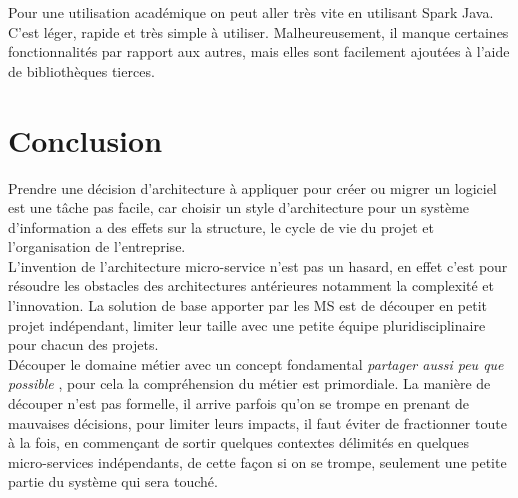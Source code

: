 \documentclass[12pt, a4paper, openany]{report}
\begin{document}
   Pour une utilisation académique on peut aller très vite en utilisant Spark Java. C'est léger, rapide et très simple à utiliser. Malheureusement, il manque certaines fonctionnalités par rapport aux autres, mais elles sont facilement ajoutées à l'aide de bibliothèques tierces.

   
  
\chapter*{Conclusion}
 
 Prendre une décision d'architecture à appliquer pour créer ou migrer un logiciel est une tâche pas facile, car choisir un style d'architecture pour un système d'information a des effets sur la structure, le cycle de vie du projet et l'organisation de l'entreprise.\\

  L'invention de l'architecture micro-service n'est pas un hasard, en effet c'est pour résoudre les obstacles des architectures antérieures notamment la complexité et l'innovation. La solution de base apporter par les MS est de découper en petit projet indépendant, limiter leur taille avec une petite équipe pluridisciplinaire pour chacun des projets.\\
  
  Découper le domaine métier avec un concept fondamental \textit{partager aussi peu que possible} \cite{refbib6}, pour cela la compréhension du métier est primordiale. La manière de découper n'est pas formelle, il arrive parfois qu'on se trompe en prenant de mauvaises décisions, pour limiter leurs impacts, il faut éviter de fractionner toute à la fois, en commençant de sortir quelques contextes délimités en quelques micro-services indépendants, de cette façon si on se trompe, seulement une petite partie du système qui sera touché.\\
  
\end{document}
